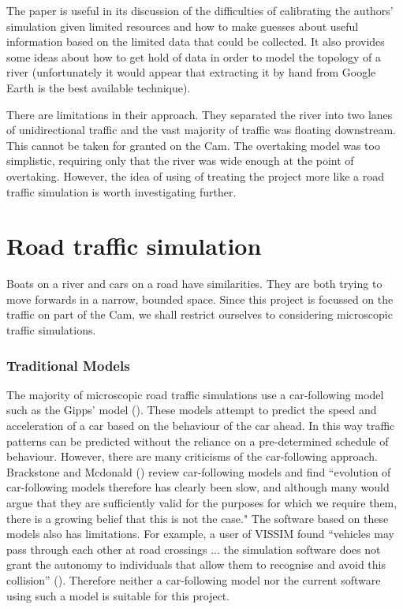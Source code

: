   The paper is useful in its discussion of the difficulties of calibrating
  the authors' simulation given limited resources and how to make guesses
  about useful information based on the limited data that could be
  collected. It also provides some ideas about how to get hold of data
  in order to model the topology of a river (unfortunately it would
  appear that extracting it by hand from Google Earth is the best available
  technique). 
  
  There are limitations in their approach. They 
  separated the river into two lanes of unidirectional traffic and the
  vast majority of traffic was floating downstream. This cannot be taken for granted on the Cam. The overtaking model was too simplistic, requiring only that the river was wide enough at the point of overtaking.
  However, the idea of using of treating the project more like a road traffic simulation is worth investigating further.
  
  \section{Road traffic simulation}
    Boats on a river and cars on a road have similarities. They are both trying to move forwards in a narrow, bounded space. Since this project is focussed on the traffic on part of the Cam, we shall restrict ourselves to considering microscopic traffic simulations.
    
    \subsubsection{Traditional Models}
    The majority of microscopic road traffic simulations use a car-following model such as the Gipps' model (\cite{Gipps1981}). These models attempt to predict the speed and acceleration of a car based on the behaviour of the car ahead. In this way traffic patterns can be predicted without the reliance on a pre-determined schedule of behaviour. However, there are many criticisms of the car-following approach. Brackstone and Mcdonald (\cite{Brackstone2000}) review car-following models and find ``evolution of car-following models therefore has clearly been slow, and although many would argue that they are sufficiently valid for the purposes for which we require them, there is a growing belief that this is not the case." The software based on these models also has limitations. For example, a user of VISSIM found ``vehicles may pass through each other at road crossings ... the simulation software does not grant the autonomy to individuals that allow them to recognise and avoid this collision'' (\cite{Manley}). Therefore neither a car-following model nor the current software using such a model is suitable for this project.
      
